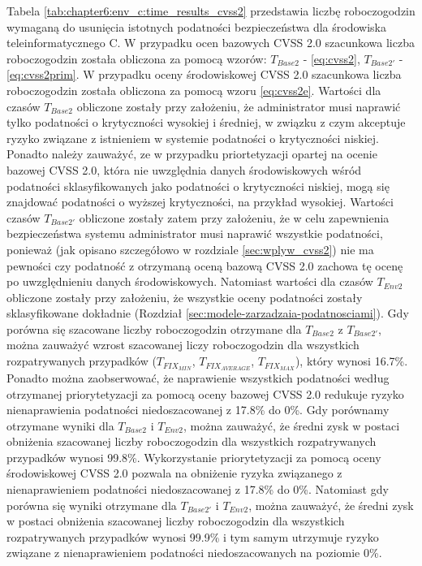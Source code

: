 \bigbreak
Tabela \ref{tab:chapter6:env_c:time_results_cvss2} przedstawia liczbę roboczogodzin wymaganą do usunięcia istotnych podatności bezpieczeństwa dla środowiska teleinformatycznego C. W przypadku ocen bazowych CVSS 2.0 szacunkowa liczba roboczogodzin została obliczona za pomocą wzorów: $T_{Base2}$ - \ref{eq:cvss2}, $T_{Base2'}$ - \ref{eq:cvss2prim}. W przypadku oceny środowiskowej CVSS 2.0 szacunkowa liczba roboczogodzin została obliczona za pomocą wzoru \ref{eq:cvss2e}. Wartości dla czasów $T_{Base2}$ obliczone zostały przy założeniu, że administrator musi naprawić tylko podatności o krytyczności wysokiej i średniej, w związku z czym akceptuje ryzyko związane z istnieniem w systemie podatności o krytyczności niskiej. Ponadto należy zauważyć, ze w przypadku priortetyzacji opartej na ocenie bazowej CVSS 2.0, która nie uwzględnia danych środowiskowych wśród podatności sklasyfikowanych jako podatności o krytyczności niskiej, mogą się znajdować podatności o wyższej krytyczności, na przykład wysokiej. Wartości czasów $T_{Base2'}$ obliczone zostały zatem przy założeniu, że w celu zapewnienia bezpieczeństwa systemu administrator musi naprawić wszystkie podatności, ponieważ (jak opisano szczegółowo w rozdziale \ref{sec:wplyw_cvss2}) nie ma pewności czy podatność z otrzymaną oceną bazową CVSS 2.0 zachowa tę ocenę po uwzględnieniu danych środowiskowych. Natomiast wartości dla czasów $T_{Env2}$ obliczone zostały przy założeniu, że wszystkie oceny podatności zostały sklasyfikowane dokładnie (Rozdział \ref{sec:modele-zarzadzaia-podatnosciami}). Gdy porówna się szacowane liczby roboczogodzin otrzymane dla $T_{Base2}$ z $T_{Base2'}$, można zauważyć wzrost szacowanej liczy roboczogodzin dla wszystkich rozpatrywanych przypadków ($T_{FIX_{MIN}}$, $T_{FIX_{AVERAGE}}$, $T_{FIX_{MAX}}$), który wynosi 16.7\%. Ponadto można zaobserwować, że naprawienie wszystkich podatności według otrzymanej priorytetyzacji za pomocą oceny bazowej CVSS 2.0 redukuje ryzyko nienaprawienia podatności niedoszacowanej z 17.8\% do 0\%. Gdy porównamy otrzymane wyniki dla $T_{Base2}$ i $T_{Env2}$, można zauważyć, że średni zysk w postaci obniżenia szacowanej liczby roboczogodzin dla wszystkich rozpatrywanych przypadków wynosi 99.8\%. Wykorzystanie priorytetyzacji za pomocą oceny środowiskowej CVSS 2.0 pozwala na obniżenie ryzyka związanego z nienaprawieniem podatności niedoszacowanej z 17.8\% do 0\%. Natomiast gdy porówna się wyniki otrzymane dla $T_{Base2'}$ i $T_{Env2}$, można zauważyć, że średni zysk w postaci obniżenia szacowanej liczby roboczogodzin dla wszystkich rozpatrywanych przypadków wynosi 99.9\% i tym samym utrzymuje ryzyko związane z nienaprawieniem podatności niedoszacowanych na poziomie 0\%.

